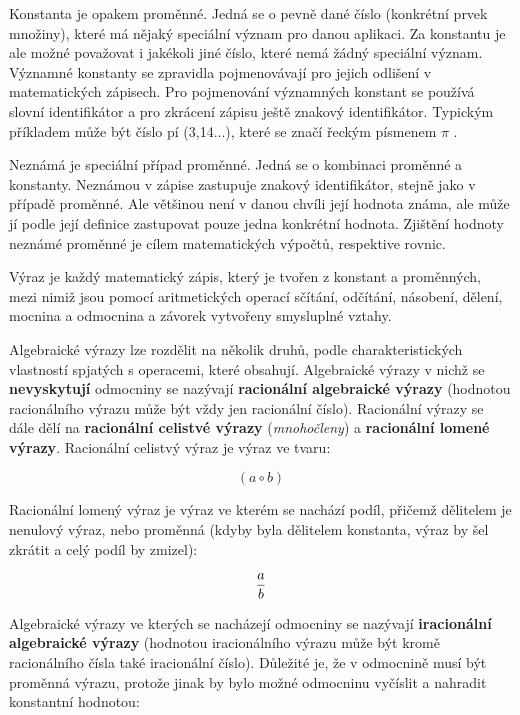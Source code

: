 
Konstanta je opakem proměnné. Jedná se o pevně dané číslo (konkrétní prvek množiny), které má nějaký speciální význam pro danou aplikaci. Za konstantu je ale možné považovat i jakékoli jiné číslo, které nemá žádný speciální význam. Významné konstanty se zpravidla pojmenovávají pro jejich odlišení v matematických zápisech. Pro pojmenování významných konstant se používá slovní identifikátor a pro zkrácení zápisu ještě znakový identifikátor. Typickým příkladem může být číslo pí (3,14...), které se značí řeckým písmenem $\pi$ .


Neznámá je speciální případ proměnné. Jedná se o kombinaci proměnné a konstanty. Neznámou v zápise zastupuje znakový identifikátor, stejně jako v případě proměnné. Ale většinou není v danou chvíli její hodnota známa, ale může jí podle její definice zastupovat pouze jedna konkrétní hodnota. Zjištění hodnoty neznámé proměnné je cílem matematických výpočtů, respektive rovnic.


Výraz je každý matematický zápis, který je tvořen z konstant a proměnných, mezi nimiž jsou pomocí aritmetických operací sčítání, odčítání, násobení, dělení, mocnina a odmocnina a závorek vytvořeny smysluplné vztahy.

Algebraické výrazy lze rozdělit na několik druhů, podle charakteristických vlastností spjatých s operacemi, které obsahují. Algebraické výrazy v nichž se {\bf nevyskytují} odmocniny se nazývají {\bf racionální algebraické výrazy} (hodnotou racionálního výrazu může být vždy jen racionální číslo). Racionální výrazy se dále dělí na {\bf racionální celistvé výrazy} ({\it mnohočleny}) a {\bf racionální lomené výrazy}. Racionální celistvý výraz je výraz ve tvaru:

$$ (a \circ b) $$

Racionální lomený výraz je výraz ve kterém se nachází podíl, přičemž dělitelem je nenulový výraz, nebo proměnná (kdyby byla dělitelem konstanta, výraz by šel zkrátit a celý podíl by zmizel):

$$ {a \over b}$$

Algebraické výrazy ve kterých se nacházejí odmocniny se nazývají {\bf iracionální algebraické výrazy} (hodnotou iracionálního výrazu může být kromě racionálního čísla také iracionální číslo). Důležité je, že v odmocnině musí být proměnná výrazu, protože jinak by bylo možné odmocninu vyčíslit a nahradit konstantní hodnotou:


